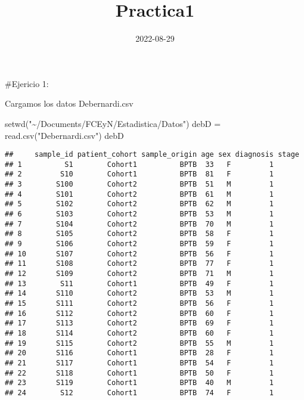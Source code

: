 \documentclass[
]{article}
\title{Practica1}
\author{}
\date{\vspace{-2.5em}2022-08-29}
\newenvironment{Shaded}{\begin{snugshade}}{\end{snugshade}}
\newcommand{\FunctionTok}[1]{\textcolor[rgb]{0.00,0.00,0.00}{#1}}
\newcommand{\NormalTok}[1]{#1}
\newcommand{\OtherTok}[1]{\textcolor[rgb]{0.56,0.35,0.01}{#1}}
\newcommand{\StringTok}[1]{\textcolor[rgb]{0.31,0.60,0.02}{#1}}
\begin{document}
\maketitle

\#Ejericio 1:

Cargamos los datos Debernardi.csv

\begin{Shaded}
\begin{Highlighting}[]
\FunctionTok{setwd}\NormalTok{(}\StringTok{"\textasciitilde{}/Documents/FCEyN/Estadistica/Datos"}\NormalTok{)}
\NormalTok{debD }\OtherTok{=} \FunctionTok{read.csv}\NormalTok{(}\StringTok{"Debernardi.csv"}\NormalTok{)}
\NormalTok{debD}
\end{Highlighting}
\end{Shaded}

\begin{verbatim}
##     sample_id patient_cohort sample_origin age sex diagnosis stage
## 1          S1        Cohort1          BPTB  33   F         1      
## 2         S10        Cohort1          BPTB  81   F         1      
## 3        S100        Cohort2          BPTB  51   M         1      
## 4        S101        Cohort2          BPTB  61   M         1      
## 5        S102        Cohort2          BPTB  62   M         1      
## 6        S103        Cohort2          BPTB  53   M         1      
## 7        S104        Cohort2          BPTB  70   M         1      
## 8        S105        Cohort2          BPTB  58   F         1      
## 9        S106        Cohort2          BPTB  59   F         1      
## 10       S107        Cohort2          BPTB  56   F         1      
## 11       S108        Cohort2          BPTB  77   F         1      
## 12       S109        Cohort2          BPTB  71   M         1      
## 13        S11        Cohort1          BPTB  49   F         1      
## 14       S110        Cohort2          BPTB  53   M         1      
## 15       S111        Cohort2          BPTB  56   F         1      
## 16       S112        Cohort2          BPTB  60   F         1      
## 17       S113        Cohort2          BPTB  69   F         1      
## 18       S114        Cohort2          BPTB  60   F         1      
## 19       S115        Cohort2          BPTB  55   M         1      
## 20       S116        Cohort1          BPTB  28   F         1      
## 21       S117        Cohort1          BPTB  54   F         1      
## 22       S118        Cohort1          BPTB  50   F         1      
## 23       S119        Cohort1          BPTB  40   M         1      
## 24        S12        Cohort1          BPTB  74   F         1      

\end{verbatim}
\end{document}
